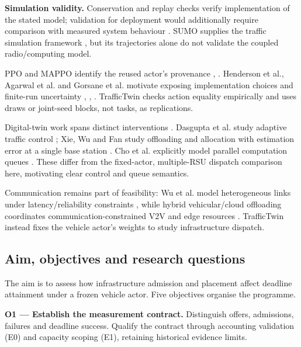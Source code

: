 \documentclass[12pt,a4paper]{article}
\begin{document}
\textbf{Simulation validity.} Conservation and replay checks verify implementation of the stated model; validation for deployment would additionally require comparison with measured system behaviour \cite{ref21}. SUMO supplies the traffic simulation framework \cite{ref22}, but its trajectories alone do not validate the coupled radio/computing model.

PPO and MAPPO identify the reused actor's provenance \cite{ref23}, \cite{ref24}. Henderson et al., Agarwal et al. and Gorsane et al. motivate exposing implementation choices and finite-run uncertainty \cite{ref25}, \cite{ref26}, \cite{ref27}. TrafficTwin checks action equality empirically and uses draws or joint-seed blocks, not tasks, as replications.

Digital-twin work spans distinct interventions \cite{ref28}. Dasgupta et al. study adaptive traffic control \cite{ref29}; Xie, Wu and Fan study offloading and allocation with estimation error at a single base station \cite{ref30}. Cho et al. explicitly model parallel computation queues \cite{ref31}. These differ from the fixed-actor, multiple-RSU dispatch comparison here, motivating clear control and queue semantics.

Communication remains part of feasibility: Wu et al. model heterogeneous links under latency/reliability constraints \cite{ref6}, while hybrid vehicular/cloud offloading coordinates communication-constrained V2V and edge resources \cite{ref32}. TrafficTwin instead fixes the vehicle actor's weights to study infrastructure dispatch.

\FloatBarrier
\subsection{Aim, objectives and research questions}\label{sec:1.3}

The aim is to assess how infrastructure admission and placement affect deadline attainment under a frozen vehicle actor. Five objectives organise the programme.

\textbf{O1 --- Establish the measurement contract.} Distinguish offers, admissions, failures and deadline success. Qualify the contract through accounting validation (E0) and capacity scoping (E1), retaining historical evidence limits.
\end{document}

